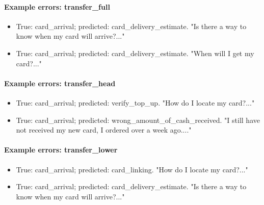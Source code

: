 \par\medskip\noindent\begin{minipage}{\linewidth}

\paragraph{Example errors: transfer\_full}

\begin{itemize}

\item True: card\_arrival; predicted: card\_delivery\_estimate. "Is there a way to know when my card will arrive?..."

\item True: card\_arrival; predicted: card\_delivery\_estimate. "When will I get my card?..."

\end{itemize}

\end{minipage}\par

\par\medskip\noindent\begin{minipage}{\linewidth}

\paragraph{Example errors: transfer\_head}

\begin{itemize}

\item True: card\_arrival; predicted: verify\_top\_up. "How do I locate my card?..."

\item True: card\_arrival; predicted: wrong\_amount\_of\_cash\_received. "I still have not received my new card, I ordered over a week ago...."

\end{itemize}

\end{minipage}\par

\par\medskip\noindent\begin{minipage}{\linewidth}

\paragraph{Example errors: transfer\_lower}

\begin{itemize}

\item True: card\_arrival; predicted: card\_linking. "How do I locate my card?..."

\item True: card\_arrival; predicted: card\_delivery\_estimate. "Is there a way to know when my card will arrive?..."

\end{itemize}

\end{minipage}\par

